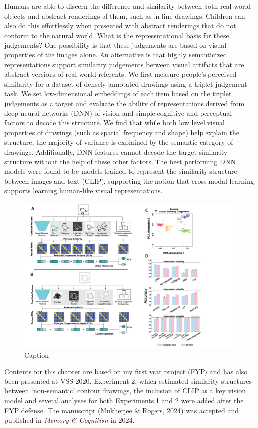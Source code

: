 \documentclass{Dissertate}
\begin{document}
Humans are able to discern the difference and similarity between both real world objects and abstract renderings of them, such as in line drawings.
Children can also do this effortlessly when presented with abstract renderings that do not conform to the natural world. 
What is the representational basis for these judgements? 
One possibility is that these judgements are based on visual properties of the images alone.
An alternative is that highly semanticized representations support similarity judgements between visual artifacts that are abstract versions of real-world referents.
We first measure people's perceived similarity for a dataset of densely annotated drawings using a triplet judgement task.
We set low-dimensional embeddings of each item based on the triplet judgements as a target and evaluate the ability of representations derived from deep neural networks (DNN) of vision and simple cognitive and perceptual factors to decode this structure.
We find that while both low level visual properties of drawings (such as spatial frequency and shape) help explain the structure, the majority of variance is explained by the semantic category of drawings.
Additionally, DNN features cannot decode the target similarity structure without the help of these other factors.
The best performing DNN models were found to be models trained to represent the similarity structure between images and text (CLIP), supporting the notion that cross-modal learning supports learning human-like visual representations.
\begin{figure}[htpb!]
    \centering
    \includegraphics[width=.8\linewidth]{proposal/figures/chap2.pdf}
    \caption{Caption}
    \label{fig:enter-label}
\end{figure}



\begin{tcolorbox}[
    colback=gray!10,  %
    colframe=black!50, %
    arc=4mm,         %
    boxrule=2pt      %
]
Contents for this chapter are based on my first year project (FYP) and has also been presented at VSS 2020.
Experiment 2, which estimated similarity structures between `non-semantic' contour drawings, the inclusion of CLIP as a key vision model and several analyses for both Experiments 1 and 2 were added after the FYP defense.
The manuscript (Mukherjee \& Rogers, 2024) was accepted and published in \textit{Memory \& Cognition} in 2024.
\end{tcolorbox}
\end{document}
